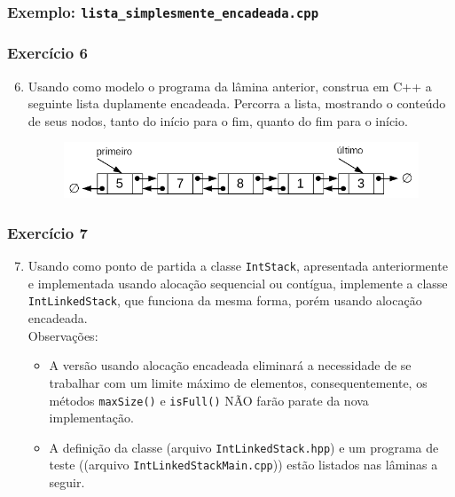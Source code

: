 \documentclass[aspectratio=169]{beamer}
\begin{document}
\begin{frame}[fragile]\frametitle{Exemplo: \texttt{lista\_simplesmente\_encadeada.cpp}}
\fontsize{5pt}{5pt}\selectfont{

}
\end{frame}

\begin{frame}[fragile]\frametitle{Exercício 6}
\begin{enumerate}
        \setcounter{enumi}{5}
	\item Usando como modelo o programa da lâmina anterior, construa em C++ a seguinte lista duplamente encadeada. Percorra a lista, mostrando o conteúdo de seus nodos, tanto do início para o fim, quanto do fim para o início.	
\begin{figure}[h]
	\centering
	\includegraphics[height=0.16\paperheight]{imagens/lista_duplamente_encadeada.png}
\end{figure}
\end{enumerate}
\end{frame}

\begin{frame}[fragile]\frametitle{Exercício 7}
\begin{enumerate}
        \setcounter{enumi}{6}
	\item Usando como ponto de partida a classe \texttt{IntStack}, apresentada anteriormente e implementada usando alocação sequencial ou contígua, implemente a classe \texttt{IntLinkedStack}, que funciona da mesma forma, porém usando alocação encadeada.\\
	Observações:
	\begin{itemize}
		\item A versão usando alocação encadeada eliminará a necessidade de se trabalhar com um limite máximo de elementos, consequentemente, os métodos \texttt{maxSize()} e \texttt{isFull()} NÃO farão parate da nova implementação.
		\item A definição da classe (arquivo \texttt{IntLinkedStack.hpp}) e um programa de teste ((arquivo \texttt{IntLinkedStackMain.cpp})) estão listados nas lâminas a seguir.
	\end{itemize}
\end{enumerate}
\end{frame}
\end{document}
